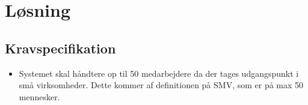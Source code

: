 \chapter{Løsning}\label{ch:losning}

\section{Kravspecifikation}

\begin{itemize}
    \item Systemet skal håndtere op til 50 medarbejdere da der tages udgangspunkt i små virksomheder. Dette kommer af definitionen på SMV, som er på max 50 mennesker.
    
\end{itemize}


